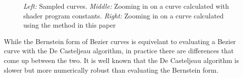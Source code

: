 \documentclass{jcgt}
\begin{document}
  \begin{figure}
    \caption{\textit{Left:} Sampled curves.  \textit{Middle:} Zooming in on a curve calculated with shader program constants.  \textit{Right:} Zooming in on a curve calculated using the method in this paper}   
    \label{fig:quickaccuracy}
  \end{figure}  

While the Bernstein form of Bezier curves is equivelant to evaluating a Bezier curve with the De Casteljeau algorithm, in practice there are differences that come up between the two.  It is well known that the De Casteljeau algorithm is slower but more numerically robust than evaluating the Bernstein form.
\end{document}
